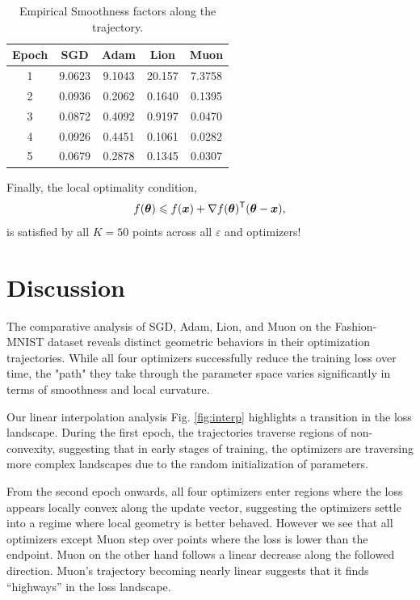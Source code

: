 \documentclass[10pt,conference,compsocconf]{IEEEtran}
\begin{document}
\begin{table}[h]
\centering
\caption{Empirical Smoothness factors along the trajectory.}
\label{tab:smooth}
\begin{tabular}{ccccc}
\hline
Epoch & SGD & Adam & Lion & Muon \\
\hline
    1 & 9.0623 & 9.1043 & 20.157 & 7.3758 \\
    2 & 0.0936 & 0.2062 & 0.1640 & 0.1395 \\
    3 & 0.0872 & 0.4092 & 0.9197 & 0.0470 \\
    4 & 0.0926 & 0.4451 & 0.1061 & 0.0282 \\
    5 & 0.0679 & 0.2878 & 0.1345 & 0.0307 \\
\hline
\end{tabular}
\end{table}

Finally, the local optimality condition,
$$ f(\boldsymbol{\theta}) \leqslant f(\boldsymbol{x}) + \nabla f(\boldsymbol{\theta})^\mathsf{T} (\boldsymbol{\theta} - \boldsymbol{x}), $$
is satisfied by all $K = 50$ points across all $\varepsilon$ and optimizers!


\section{Discussion}
The comparative analysis of SGD, Adam, Lion, and Muon on the Fashion-MNIST dataset reveals distinct
geometric behaviors in their optimization trajectories. While all four optimizers successfully
reduce the training loss over time, the "path" they take through the parameter space varies
significantly in terms of smoothness and local curvature.

Our linear interpolation analysis Fig. \ref{fig:interp} highlights a transition in the loss
landscape. During the first epoch, the trajectories traverse regions of non-convexity, suggesting
that in early stages of training, the optimizers are traversing more complex landscapes due to the
random initialization of parameters.

From the second epoch onwards, all four optimizers enter regions where the loss appears locally
convex along the update vector, suggesting the optimizers settle into a regime where local geometry
is better behaved.
However we see that all optimizers except Muon step over points where the loss is lower than the
endpoint. Muon on the other hand follows a linear decrease along the followed direction.
Muon's trajectory becoming nearly linear suggests that it finds ``highways'' in the loss landscape.
\end{document}
